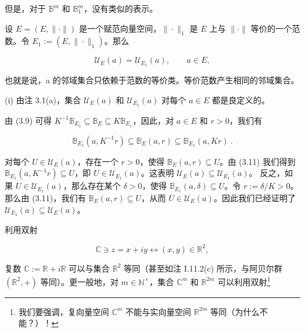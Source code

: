\begin{remark}
但是，对于 $ \mathbb{B}^{m} $ 和 $ \mathbb{B}_{1}^{m} $，没有类似的表示。

\begin{items}
\item[（d）]

设 $ E = (E, \|\cdot\|) $ 是一个赋范向量空间，$ \|\cdot\|_1 $ 是 $ E $ 上与 $ \|\cdot\| $ 等价的一个范数。令 $ E_1 := (E, \|\cdot\|_1) $。那么

\[
\mathcal{U}_{E}(a)=\mathcal{U}_{E_{1}}(a),\qquad a\in E,
\]

也就是说，a 的邻域集合只依赖于范数的等价类。等价范数产生相同的邻域集合。

\begin{subitems}
\item

\proofhead
(i) 由注 3.1(a)，集合 $ \mathcal{U}_E(a) $ 和 $ \mathcal{U}_{E_1}(a) $ 对每个 $ a \in E $ 都是良定义的。
\item

由 (3.9) 可得 $ K^{-1}\mathbb{B}_{E_1} \subseteq \mathbb{B}_E \subseteq K\mathbb{B}_{E_1} $，因此，对 $ a \in E $ 和 $ r > 0 $，我们有

\begin{equation}
\mathbb{B}_{E_{1}}(a,K^{-1}r)\subseteq\mathbb{B}_{E}(a,r)\subseteq\mathbb{B}_{E_{1}}(a,K r)~.
\end{equation}
\item

对每个 $U \in \mathcal{U}_E(a)$，存在一个 $r > 0$，使得 $\mathbb{B}_E(a, r) \subseteq U$。由 (3.11) 我们得到 $\mathbb{B}_{E_1}(a, K^{-1}r) \subseteq U$，即 $U \in \mathcal{U}_{E_1}(a)$。这表明 $\mathcal{U}_E(a) \subseteq \mathcal{U}_{E_1}(a)$。
反之，如果 $U \in \mathcal{U}_{E_1}(a)$，那么存在某个 $\delta > 0$，使得 $\mathbb{B}_{E_1}(a, \delta) \subseteq U$。令 $r := \delta/K > 0$。那么由 (3.11)，我们有 $\mathbb{B}_E(a, r) \subseteq U$，从而 $U \in \mathcal{U}_E(a)$。因此我们已经证明了 $\mathcal{U}_{E_1}(a) \subseteq \mathcal{U}_E(a)$。

\end{subitems}

\item[（e）]

利用双射

\[
\mathbb{C}\ni z=x+i y\longleftrightarrow(x,y)\in\mathbb{R}^{2},
\]

复数 $\mathbb{C} := \mathbb{R} + i\mathbb{R}$ 可以与集合 $\mathbb{R}^2$ 等同（甚至如注 I.11.2(c) 所示，与阿贝尔群 $(\mathbb{R}^2, +)$ 等同）。更一般地，对 $m \in \mathbb{N}^\times$，集合 $\mathbb{C}^m$ 和 $\mathbb{R}^{2m}$ 可以利用双射\footnote{我们要强调，复向量空间 $\mathbb C^{m}$ 不能与实向量空间 $\mathbb R^{2m}$ 等同（为什么不能？）！}


\end{items}
\end{remark}
